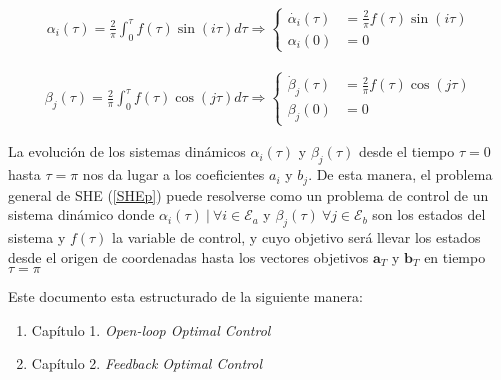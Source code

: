 \begin{gather}
    \alpha_i(\tau) = \frac{2}{\pi}\int_0^\tau f(\tau) \sin(i\tau)d\tau 
    \Rightarrow
    \begin{cases} \label{ode}
        \dot{\alpha_i}(\tau) & = \frac{2}{\pi}f(\tau)\sin(i\tau) \\  
        \alpha_i(0) & = 0       
    \end{cases}
\end{gather}

\begin{gather}
    \beta_j(\tau) = \frac{2}{\pi}\int_0^\tau f(\tau) \cos(j\tau)d\tau 
    \Rightarrow
    \begin{cases} \label{ode}
        \dot{\beta}_j(\tau) & = \frac{2}{\pi}f(\tau)\cos(j\tau) \\  
        \beta_j(0) & = 0       
    \end{cases}
\end{gather}

La evolución de los sistemas dinámicos $\alpha_i(\tau)$ y $\beta_j(\tau)$ desde el tiempo $\tau=0$ hasta $\tau=\pi$ nos da lugar a los coeficientes $a_i$ y $b_j$. 
De esta manera, el problema general de SHE (\ref{SHEp}) puede resolverse como un problema de control de un sistema dinámico donde $\alpha_i(\tau) \ | \ \forall i \in \mathcal{E}_a  $ y $ \beta_j(\tau) \ \forall j \in \mathcal{E}_b$ son los estados del sistema y $f(\tau)$ la variable de control, y cuyo objetivo será llevar los estados desde el origen de coordenadas hasta los vectores objetivos $\bm{a}_T$ y $\bm{b}_T$ en tiempo $\tau = \pi$
\newline

Este documento esta estructurado de la siguiente manera:
\begin{enumerate}
    \item Capítulo 1. \emph{Open-loop Optimal Control}
    \item Capítulo 2. \emph{Feedback Optimal Control}
\end{enumerate}